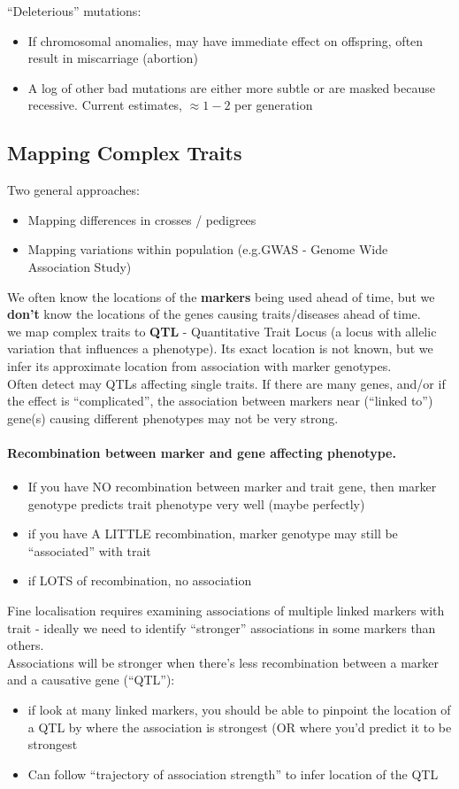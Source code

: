\documentclass{scrartcl}
\begin{document}
``Deleterious'' mutations:
\begin{itemize}
\item If chromosomal anomalies, may have immediate effect on offspring, often result in miscarriage (abortion)
\item A log of other bad mutations are either more subtle or are masked because recessive.
Current estimates, $\approx 1-2$ per generation
\end{itemize}
\subsection{Mapping Complex Traits}
\label{sec:4-4}
Two general approaches:
\begin{itemize}
\item Mapping differences in crosses / pedigrees
\item Mapping variations within population (e.g.GWAS - Genome Wide Association Study)
\end{itemize}
We often know the locations of the {\bf markers} being used ahead of time, but we {\bf don't} know the locations of the genes causing traits/diseases ahead of time.\\
we map complex traits to {\bf QTL} - Quantitative Trait Locus (a locus with allelic variation that influences a phenotype).
Its exact location is not known, but we infer its approximate location from association with marker genotypes.\\
Often detect may QTLs affecting single traits.
If there are many genes, and/or if the effect is ``complicated'', the association between markers near (``linked to'') gene(s) causing different phenotypes may not be very strong. 

\paragraph{Recombination between marker and gene affecting phenotype.}
\begin{itemize}
\item If you have NO recombination between marker and trait gene, then marker genotype predicts trait phenotype very well (maybe perfectly)
\item if you have A LITTLE recombination, marker genotype may still be ``associated'' with trait
\item if LOTS of recombination, no association
\end{itemize}
Fine localisation requires examining associations of multiple linked markers with trait - ideally we need to identify ``stronger'' associations in some markers than others. \\
Associations will be stronger when there's less recombination between a marker and a causative gene (``QTL''):
\begin{itemize}
\item if look at many linked markers, you should be able to pinpoint the location of a QTL by where the association is strongest (OR where you'd predict it to be strongest
\item Can follow ``trajectory of association strength'' to infer location of the QTL
\end{itemize}
\end{document}
